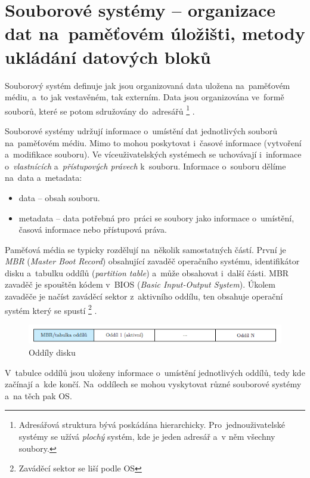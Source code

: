 
\clearpage
\section{Souborové systémy -- organizace dat na~paměťovém úložišti, metody ukládání datových bloků}

Souborový systém definuje jak jsou organizovaná data uložena na~paměťovém médiu, a~to jak vestavěném, tak externím. Data jsou organizována ve~formě souborů, které se potom sdružovány do~adresářů%
\footnote{Adresářová struktura bývá poskádána hierarchicky. Pro~jednouživatelské systémy se užívá \emph{plochý} systém, kde je jeden adresář a~v něm všechny soubory.}%
.

Souborové systémy udržují informace o~umístění dat jednotlivých souborů na~paměťovém médiu. Mimo to mohou poskytovat i~časové informace (vytvoření a~modifikace souboru). Ve víceuživatelských systémech se uchovávají i~informace o~\emph{vlastnících} a~\emph{přístupových právech} k~souboru. Informace o~souboru dělíme na~data a~metadata:

\begin{itemize}
	\item data -- obsah souboru.
	\item metadata -- data potřebná pro~práci se soubory jako informace o~umístění, časová informace nebo přístupová práva.
\end{itemize}

Paměťová média se typicky rozdělují na~několik samostatných částí. První je \emph{MBR} (\emph{Master Boot Record}) obsahující zavaděč operačního systému, identifikátor disku a~tabulku oddílů (\emph{partition table}) a~může obsahovat i~další části. MBR zavaděč je spouštěn kódem v~BIOS (\emph{Basic Input-Output System}). Úkolem zavaděče je načíst zaváděcí sektor z~aktivního oddílu, ten obsahuje operační systém který se spustí%
\footnote{Zaváděcí sektor se liší podle OS}%
.

\begin{figure}[ht]
	\centering
	\includegraphics[scale=1]{images/mem_partitions.png}
	\caption{Oddíly disku}
	\label{mem_partitions}
\end{figure}

V~tabulce oddílů jsou uloženy informace o~umístění jednotlivých oddílů, tedy kde začínají a~kde končí. Na~oddílech se mohou vyskytovat různé souborové systémy a~na těch pak OS.

